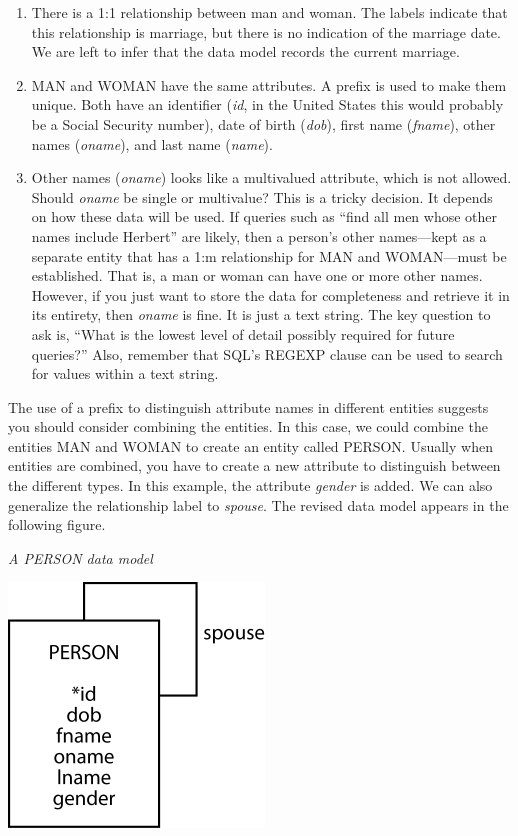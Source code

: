 \documentclass[
]{article}
\begin{document}
\begin{enumerate}
\def\labelenumi{\arabic{enumi}.}
\item
  There is a 1:1 relationship between man and woman. The labels
  indicate that this relationship is marriage, but there is no
  indication of the marriage date. We are left to infer that the data
  model records the current marriage.
\item
  MAN and WOMAN have the same attributes. A prefix is used to make
  them unique. Both have an identifier (\emph{id}, in the United States
  this would probably be a Social Security number), date of birth
  (\emph{dob}), first name (\emph{fname}), other names (\emph{oname}), and last name
  (\emph{name}).
\item
  Other names (\emph{oname}) looks like a multivalued attribute, which is
  not allowed. Should \emph{oname} be single or multivalue? This is a
  tricky decision. It depends on how these data will be used. If
  queries such as ``find all men whose other names include Herbert'' are
  likely, then a person's other names---kept as a separate entity that
  has a 1:m relationship for MAN and WOMAN---must be established. That
  is, a man or woman can have one or more other names. However, if you
  just want to store the data for completeness and retrieve it in its
  entirety, then \emph{oname} is fine. It is just a text string. The key
  question to ask is, ``What is the lowest level of detail possibly
  required for future queries?'' Also, remember that SQL's REGEXP
  clause can be used to search for values within a text string.
\end{enumerate}

The use of a prefix to distinguish attribute names in different entities
suggests you should consider combining the entities. In this case, we
could combine the entities MAN and WOMAN to create an entity called
PERSON. Usually when entities are combined, you have to create a new
attribute to distinguish between the different types. In this example,
the attribute \emph{gender} is added. We can also generalize the relationship
label to \emph{spouse}. The revised data model appears in the following
figure.

\emph{A PERSON data model}

\includegraphics[width=2.67708in,height=\textheight]{Figures/Chapter 7/marriage-2.png}
\end{document}
